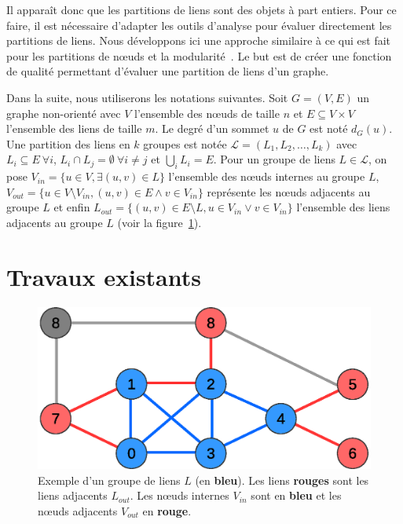 Il apparaît donc que les partitions de liens sont des objets à part entiers.
Pour ce faire, il est nécessaire d'adapter les outils d'analyse pour évaluer directement les partitions de liens.
Nous développons ici une approche similaire à ce qui est fait pour les partitions de n\oe uds et la modularité~\cite{Newman2004}.
Le but est de créer une fonction de qualité permettant d'évaluer une partition de liens d'un graphe.

Dans la suite, nous utiliserons les notations suivantes.
Soit $G=(V,E)$ un graphe non-orienté avec $V$ l'ensemble des n\oe uds de taille $n$ et $E \subseteq V \times V$ l'ensemble des liens de taille $m$. 
Le degré d'un sommet $u$ de $G$ est noté $d_G(u)$.
Une partition des liens en $k$ groupes est notée $\mathcal{L}=(L_1,L_2,\ldots,L_k)$ avec $L_i \subseteq E \ \forall i$, $L_i\cap L_j=\emptyset \ \forall i\neq j$ et $\bigcup_i L_i=E$.
Pour un groupe de liens $L \in \mathcal{L}$, on pose $V_{in}=\{u \in V, \exists (u,v) \in L\}$ l'ensemble des n\oe uds internes au groupe $L$, $V_{out}=\{u \in V\setminus V_{in}, (u,v) \in E \wedge v \in V_{in} \}$ représente les n\oe uds adjacents au groupe $L$ et enfin $L_{out}=\{(u,v) \in E \setminus L, u \in V_{in} \vee v \in V_{in} \}$ l'ensemble des liens adjacents au groupe $L$ (voir la figure~\ref{fig:example_def_expected}).

\section{Travaux existants}
\label{sec:expected_travaux}
\begin{figure}
\centering
\includegraphics[width=0.4\linewidth]{img/ExpectedNodes/exemple2}
\caption{Exemple d'un groupe de liens $L$ (en \textcolor{semilightblue}{\textbf{bleu}}). Les liens \textcolor{pinkyred}{\textbf{rouges}} sont les liens adjacents $L_{out}$.
Les n\oe uds internes $V_{in}$ sont en \textcolor{semilightblue}{\textbf{bleu}} et les n\oe uds adjacents $V_{out}$ en  \textcolor{pinkyred}{\textbf{rouge}}.}
\label{fig:example_def_expected}
\end{figure}

